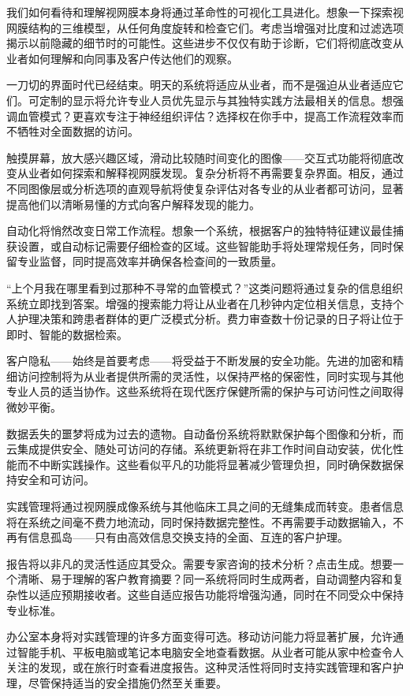 \documentclass[
  Letterpaper,
]{scrbook}
\begin{document}
我们如何看待和理解视网膜本身将通过革命性的可视化工具进化。想象一下探索视网膜结构的三维模型，从任何角度旋转和检查它们。考虑当增强对比度和过滤选项揭示以前隐藏的细节时的可能性。这些进步不仅仅有助于诊断，它们将彻底改变从业者如何理解和向同事及客户传达他们的观察。

一刀切的界面时代已经结束。明天的系统将适应从业者，而不是强迫从业者适应它们。可定制的显示将允许专业人员优先显示与其独特实践方法最相关的信息。想强调血管模式？更喜欢专注于神经组织评估？选择权在你手中，提高工作流程效率而不牺牲对全面数据的访问。

触摸屏幕，放大感兴趣区域，滑动比较随时间变化的图像------交互式功能将彻底改变从业者如何探索和解释视网膜发现。复杂分析将不再需要复杂界面。相反，通过不同图像层或分析选项的直观导航将使复杂评估对各专业的从业者都可访问，显著提高他们以清晰易懂的方式向客户解释发现的能力。

自动化将悄然改变日常工作流程。想象一个系统，根据客户的独特特征建议最佳捕获设置，或自动标记需要仔细检查的区域。这些智能助手将处理常规任务，同时保留专业监督，同时提高效率并确保各检查间的一致质量。

``上个月我在哪里看到过那种不寻常的血管模式？''这类问题将通过复杂的信息组织系统立即找到答案。增强的搜索能力将让从业者在几秒钟内定位相关信息，支持个人护理决策和跨患者群体的更广泛模式分析。费力审查数十份记录的日子将让位于即时、智能的数据检索。

客户隐私------始终是首要考虑------将受益于不断发展的安全功能。先进的加密和精细访问控制将为从业者提供所需的灵活性，以保持严格的保密性，同时实现与其他专业人员的适当协作。这些系统将在现代医疗保健所需的保护与可访问性之间取得微妙平衡。

数据丢失的噩梦将成为过去的遗物。自动备份系统将默默保护每个图像和分析，而云集成提供安全、随处可访问的存储。系统更新将在非工作时间自动安装，优化性能而不中断实践操作。这些看似平凡的功能将显著减少管理负担，同时确保数据保持安全和可访问。

实践管理将通过视网膜成像系统与其他临床工具之间的无缝集成而转变。患者信息将在系统之间毫不费力地流动，同时保持数据完整性。不再需要手动数据输入，不再有信息孤岛------只有由高效信息交换支持的全面、互连的客户护理。

报告将以非凡的灵活性适应其受众。需要专家咨询的技术分析？点击生成。想要一个清晰、易于理解的客户教育摘要？同一系统将同时生成两者，自动调整内容和复杂性以适应预期接收者。这些自适应报告功能将增强沟通，同时在不同受众中保持专业标准。

办公室本身将对实践管理的许多方面变得可选。移动访问能力将显著扩展，允许通过智能手机、平板电脑或笔记本电脑安全地查看数据。从业者可能从家中检查令人关注的发现，或在旅行时查看进度报告。这种灵活性将同时支持实践管理和客户护理，尽管保持适当的安全措施仍然至关重要。
\end{document}
